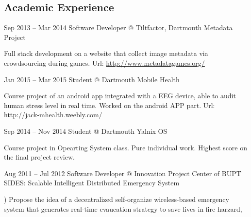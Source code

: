 \documentclass{tccv}
\begin{document}
\begin{eventlist}
     
     
     
     
     
     
     
     
     
    
    
    
    
    
    
    
    
    
    
    
    
    
    
    
    
    
    





\clearpage
\section{Academic Experience}

\item{Sep 2013 -- Mar 2014}
     {Software Developer @ Tiltfactor, Dartmouth}
     {Metadata Project}
     
     \quad Full stack development on a website that collect image metadata via crowdsourcing during games. Url: \url{http://www.metadatagames.org/}

\item{Jan 2015 -- Mar 2015}
     {Student @ Dartmouth}
     {Mobile Health}
     
     \quad Course project of an android app integrated with a EEG device, able to audit human stress level in real time. Worked on the android APP part. Url: \url{http://jack-mhealth.weebly.com/}

\item{Sep 2014 -- Nov 2014}
     {Student @ Dartmouth}
     {Yalnix OS}
     
     \quad Course project in Opearting System class. Pure individual work. Highest score on the final project review.





\item{Aug 2011 -- Jul 2012}
     {Software Developer @ Innovation Project Center of BUPT}
     {SIDES: Scalable Intelligent Distributed Emergency System}
     
     ) Propose the idea of a decentralized self-organize wireless-based emergency system that generates real-time evaucation strategy to save lives in fire harzard, 
     

\end{eventlist}
\end{document}
